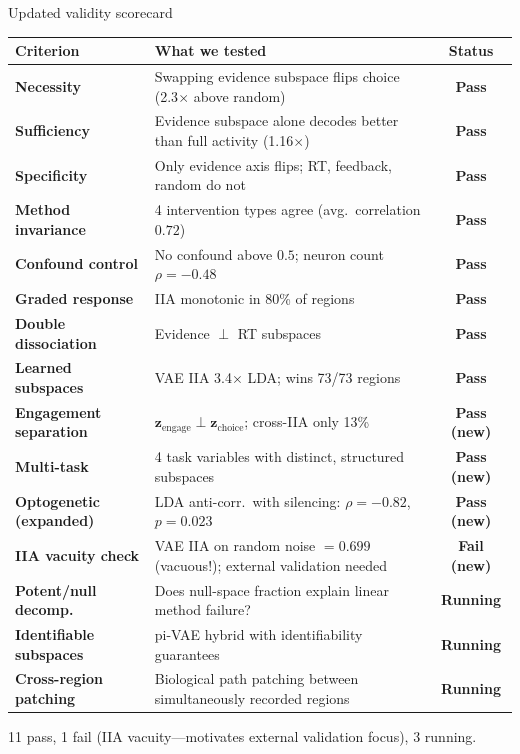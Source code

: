 \documentclass[aspectratio=169,11pt]{beamer}
\begin{document}
\begin{frame}{Updated validity scorecard}
\vspace{-0.5em}
{\scriptsize
\begin{tabular}{lp{7cm}c}
\toprule
\textbf{Criterion} & \textbf{What we tested} & \textbf{Status} \\
\midrule
\textbf{Necessity} & Swapping evidence subspace flips choice (2.3$\times$ above random) & \textcolor{pass}{\textbf{Pass}} \\
\textbf{Sufficiency} & Evidence subspace alone decodes better than full activity (1.16$\times$) & \textcolor{pass}{\textbf{Pass}} \\
\textbf{Specificity} & Only evidence axis flips; RT, feedback, random do not & \textcolor{pass}{\textbf{Pass}} \\
\textbf{Method invariance} & 4 intervention types agree (avg.\ correlation $0.72$) & \textcolor{pass}{\textbf{Pass}} \\
\textbf{Confound control} & No confound above $0.5$; neuron count $\rho = -0.48$ & \textcolor{pass}{\textbf{Pass}} \\
\textbf{Graded response} & IIA monotonic in 80\% of regions & \textcolor{pass}{\textbf{Pass}} \\
\textbf{Double dissociation} & Evidence $\perp$ RT subspaces & \textcolor{pass}{\textbf{Pass}} \\
\textbf{Learned subspaces} & VAE IIA 3.4$\times$ LDA; wins 73/73 regions & \textcolor{pass}{\textbf{Pass}} \\
\textbf{Engagement separation} & $\mathbf{z}_{\text{engage}} \perp \mathbf{z}_{\text{choice}}$; cross-IIA only 13\% & \textcolor{pass}{\textbf{Pass (new)}} \\
\textbf{Multi-task} & 4 task variables with distinct, structured subspaces & \textcolor{pass}{\textbf{Pass (new)}} \\
\textbf{Optogenetic (expanded)} & LDA anti-corr.\ with silencing: $\rho = -0.82$, $p = 0.023$ & \textcolor{pass}{\textbf{Pass (new)}} \\
\textbf{IIA vacuity check} & VAE IIA on random noise $= 0.699$ (vacuous!); external validation needed & \textcolor{fail}{\textbf{Fail (new)}} \\
\textbf{Potent/null decomp.} & Does null-space fraction explain linear method failure? & \textcolor{causal}{\textbf{Running}} \\
\textbf{Identifiable subspaces} & pi-VAE hybrid with identifiability guarantees & \textcolor{causal}{\textbf{Running}} \\
\textbf{Cross-region patching} & Biological path patching between simultaneously recorded regions & \textcolor{causal}{\textbf{Running}} \\
\bottomrule
\end{tabular}
}

\vspace{0.3em}
{\small 11 pass, 1 fail (IIA vacuity---motivates external validation focus), 3 running.}
\end{frame}
\end{document}
